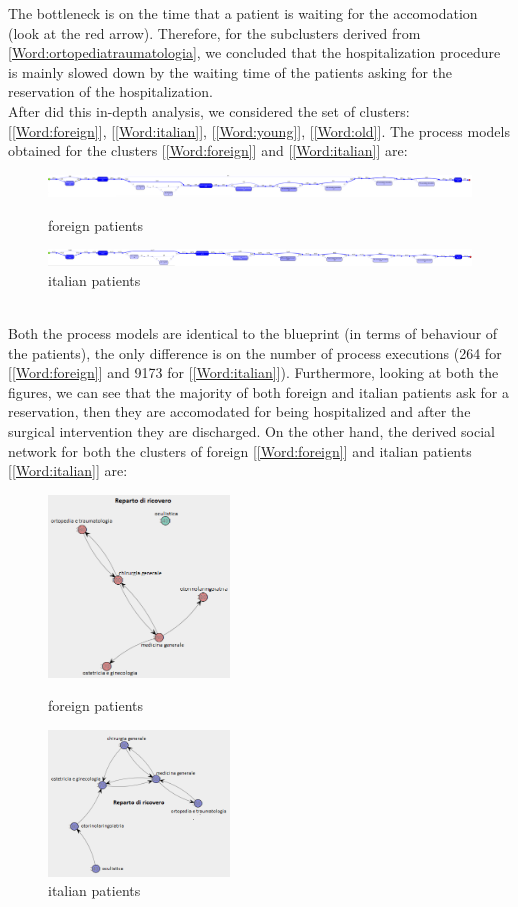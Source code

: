 The bottleneck is on the time that a patient is waiting for the accomodation (look at the red arrow). Therefore, for the subclusters derived from \ref{Word:ortopediatraumatologia}, we concluded that the hospitalization procedure is mainly slowed down by the waiting time of the patients asking for the reservation of the hospitalization.\\
After did this in-depth analysis, we considered the set of clusters: [\ref{Word:foreign}], [\ref{Word:italian}], [\ref{Word:young}],  [\ref{Word:old}]. The process models obtained for the clusters [\ref{Word:foreign}] and [\ref{Word:italian}] are:
\begin{figure} [htbp]
\includegraphics[width=\textwidth]{RicoveriInductiveVisualMinerForeigns}
\caption{foreign patients}
\includegraphics[width=\textwidth]{RicoveriInductiveVisualMinerItalian}
\caption{italian patients}
\end{figure}\\
Both the process models are identical to the blueprint (in terms of behaviour of the patients), the only difference is on the number of process executions (264 for [\ref{Word:foreign}] and 9173 for [\ref{Word:italian}]). Furthermore, looking at both the figures, we can see that the majority of both foreign and italian patients ask for a reservation, then they are accomodated for being hospitalized and after the surgical intervention they are discharged. On the other hand, the derived social network for both the clusters of foreign [\ref{Word:foreign}] and italian patients [\ref{Word:italian}] are:
\begin{figure} [htbp]
\includegraphics[width=0.43\textwidth]{RicoveriSocialNetworkForeigns}
\caption{foreign patients}
\includegraphics[width=0.43\textwidth]{RicoveriSocialNetworkItalians}
\caption{italian patients}
\end{figure}\\
